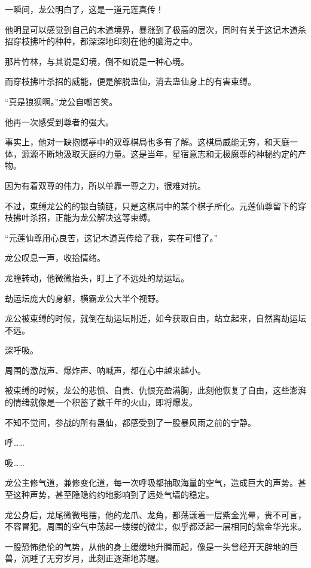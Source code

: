
\begin{this_body}



一瞬间，龙公明白了，这是一道元莲真传！

他明显可以感觉到自己的木道境界，暴涨到了极高的层次，同时有关于这记木道杀招穿枝拂叶的种种，都深深地印刻在他的脑海之中。

那片竹林，与其说是幻境，倒不如说是一种心境。

而穿枝拂叶杀招的威能，便是解脱蛊仙，消去蛊仙身上的有害束缚。

“真是狼狈啊。”龙公自嘲苦笑。

他再一次感受到尊者的强大。

事实上，他对一缺抱憾亭中的双尊棋局也多有了解。这棋局威能无穷，和天庭一体，源源不断地汲取天庭的力量。这是当年，星宿意志和无极魔尊的神秘约定的产物。

因为有着双尊的伟力，所以单靠一尊之力，很难对抗。

不过，束缚龙公的的银白锁链，只是这棋局中的某个棋子所化。元莲仙尊留下的穿枝拂叶杀招，正能为龙公解决这等束缚。

“元莲仙尊用心良苦，这记木道真传给了我，实在可惜了。”

龙公叹息一声，收拾情绪。

龙瞳转动，他微微抬头，盯上了不远处的劫运坛。

劫运坛庞大的身躯，横霸龙公大半个视野。

龙公被束缚的时候，就倒在劫运坛附近，如今获取自由，站立起来，自然离劫运坛不远。

深呼吸。

周围的激战声、爆炸声、呐喊声，都在心中越来越小。

被束缚的时候，龙公的悲愤、自责、仇恨充盈满胸，此刻他恢复了自由，这些澎湃的情绪就像是一个积蓄了数千年的火山，即将爆发。

不知不觉间，参战的所有蛊仙，都感受到了一股暴风雨之前的宁静。

呼……

吸……

龙公主修气道，兼修变化道，每一次呼吸都抽取海量的空气，造成巨大的声势。甚至这种声势，甚至隐隐约约地影响到了远处气墙的稳定。

龙公身后，龙尾微微甩摆，他的龙爪、龙角，都荡漾着一层紫金光晕，贵不可言，不容冒犯。周围的空气中荡起一缕缕的微尘，似乎都泛起一层相同的紫金华光来。

一股恐怖绝伦的气势，从他的身上缓缓地升腾而起，像是一头曾经开天辟地的巨兽，沉睡了无穷岁月，此刻正逐渐地苏醒。


\end{this_body}
